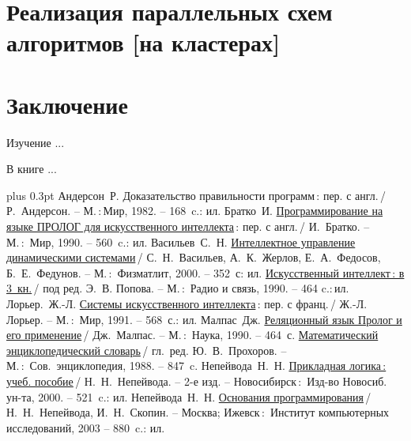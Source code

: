 \documentclass[14pt, a4paper, openany, twoside, draft]{extbook} %
\newcommand{\e}[2][fcolor]{\textcolor{pcolor}{[}\textcolor{#1}{#2}\textcolor{pcolor}{]}}
\def\emphbib#1{#1}
\begin{document}
\chapter{Реализация параллельных схем алгоритмов \e{на кластерах}}

\chapter*{Заключение}


Изучение ...

В книге ...


\begin{thebibliography}{99}\itemsep1pt \parskip 0pt plus 0.3pt
 Андерсон~Р. \emphbib{Доказательство правильности программ}\,{}: пер. с англ.\,{}/ Р.~Андерсон. -- М.\,:\,Мир, 1982. -- 168~c.: ил.
 Братко~И. \emphbib{\href{http://royallib.ru/book/bratko_ivan/programmirovanie_na_yazike_prolog_dlya_iskusstvennogo_intellekta.html}{Программирование на языке ПРОЛОГ для искусственного интеллекта}}\,{}: пер. с англ.\,/ И.~Братко. -- М.\,:~Мир, 1990. -- 560~c.: ил.
 Васильев~С.~Н. \emphbib{\href{http://bookfi.org/book/616050}{Интеллектное управление динамическими системами}}\,{}/ С.~Н.~Васильев, А.~К.~Жерлов, Е.~А.~Федосов, Б.~Е.~Федунов. -- М.\,:~Физматлит, 2000. -- 352~с: ил.
 \emphbib{\href{http://aihandbook.intsys.org.ru/index.php/intro/ai-handbook}{Искусственный интеллект\,{}: в 3~кн.}}\,{}/ под ред. Э.~В. Попова. -- М.\,:~Радио и связь, 1990. -- 464 c.:\,{}ил.
 Лорьер.~Ж.-Л.  \emphbib{\href{http://publ.lib.ru/ARCHIVES/L/LOR'ER_Jan_Lui/_Lor'er_J.L..html}{Системы искусственного интеллекта}\,{}: пер. с франц.}\,{}/ Ж.-Л. Лорьер. -- М.\,:~Мир, 1991. -- 568~с.: ил.
 Малпас~Дж. \emphbib{\href{http://padaread.com/?book=40731&pg=1}{Реляционный язык Пролог и его применение}}\,{}/ Дж.~Малпас. -- М.\,:~Наука, 1990. -- 464~с.
 \emphbib{\href{https://app.box.com/shared/793ukgvblxmj0hh6btw4}{Математический энциклопедический словарь}}\,{}/ гл.~ред. Ю.~В.~Прохоров. -- М.\,:~Сов.~энциклопедия, 1988. -- 847~c.
 Непейвода~Н.~Н. \emphbib{\href{http://www.logic-books.info/taxonomy/term/215}{Прикладная логика\,{}: учеб. пособие}}\,{}/ Н.~Н.~Непейвода. -- 2-е изд. -- Новосибирск\,{}:~Изд-во Новосиб. ун-та, 2000. -- 521~c.: ил.
 Непейвода~Н.~Н.  \emphbib{\href{http://philosophy.ru/library/logic_math/library/nepeivoda_prog.pdf}{Основания программирования}}\,{}/ Н.~Н.~Непейвода, И.~Н.~Скопин. -- Москва; Ижевск\,{}:~Институт компьютерных исследований, 2003 -- 880~c.: ил.

\end{thebibliography}
\end{document}
